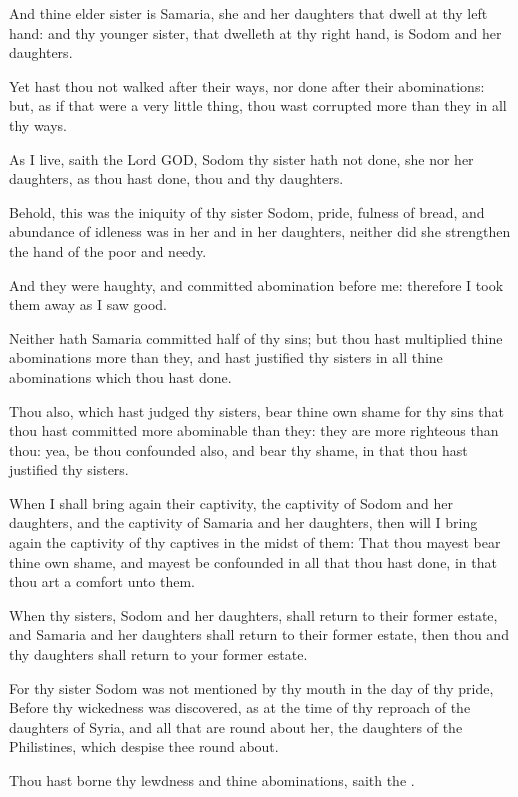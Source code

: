 \Verse And thine elder sister is Samaria, she and her daughters that dwell at thy left hand: and thy younger sister, that dwelleth at thy right hand, is Sodom and her daughters.

\Verse Yet hast thou not walked after their ways, nor done after their abominations: but, as if that were a very little thing, thou wast corrupted more than they in all thy ways.

\Verse As I live, saith the Lord GOD, Sodom thy sister hath not done, she nor her daughters, as thou hast done, thou and thy daughters.

\Verse Behold, this was the iniquity of thy sister Sodom, pride, fulness of bread, and abundance of idleness was in her and in her daughters, neither did she strengthen the hand of the poor and needy.

\Verse And they were haughty, and committed abomination before me: therefore I took them away as I saw good.

\Verse Neither hath Samaria committed half of thy sins; but thou hast multiplied thine abominations more than they, and hast justified thy sisters in all thine abominations which thou hast done.

\Verse Thou also, which hast judged thy sisters, bear thine own shame for thy sins that thou hast committed more abominable than they: they are more righteous than thou: yea, be thou confounded also, and bear thy shame, in that thou hast justified thy sisters.

\Verse When I shall bring again their captivity, the captivity of Sodom and her daughters, and the captivity of Samaria and her daughters, then will I bring again the captivity of thy captives in the midst of them: \Verse That thou mayest bear thine own shame, and mayest be confounded in all that thou hast done, in that thou art a comfort unto them.

\Verse When thy sisters, Sodom and her daughters, shall return to their former estate, and Samaria and her daughters shall return to their former estate, then thou and thy daughters shall return to your former estate.

\Verse For thy sister Sodom was not mentioned by thy mouth in the day of thy pride, \Verse Before thy wickedness was discovered, as at the time of thy reproach of the daughters of Syria, and all that are round about her, the daughters of the Philistines, which despise thee round about.

\Verse Thou hast borne thy lewdness and thine abominations, saith the \LORD.

